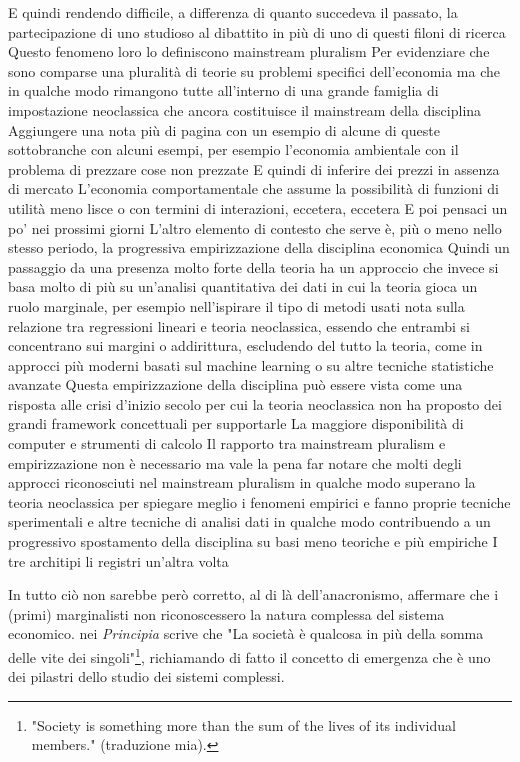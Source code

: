 \documentclass[a4paper, headings=standardclasses]{scrartcl}
\begin{document}
E quindi rendendo difficile, a differenza di quanto succedeva il passato, la partecipazione di uno studioso al dibattito
in più di uno di questi filoni di ricerca
Questo fenomeno loro lo definiscono mainstream pluralism
Per evidenziare che sono comparse una pluralità di teorie su problemi specifici dell'economia
ma che in qualche modo rimangono tutte all'interno di una grande famiglia di impostazione neoclassica che ancora costituisce il mainstream della disciplina
Aggiungere una nota più di pagina con un esempio di alcune di queste sottobranche
con alcuni esempi, per esempio l'economia ambientale con il problema di prezzare cose non prezzate
E quindi di inferire dei prezzi in assenza di mercato
L'economia comportamentale che assume la possibilità di funzioni di utilità meno lisce o con termini di interazioni, eccetera, eccetera
E poi pensaci un po' nei prossimi giorni
L'altro elemento di contesto che serve è, più o meno nello stesso periodo, la progressiva empirizzazione della disciplina economica
Quindi un passaggio da una presenza molto forte della teoria
ha un approccio che invece si basa molto di più su un'analisi quantitativa dei dati
in cui la teoria gioca un ruolo marginale, per esempio nell'ispirare il tipo di metodi usati
nota sulla relazione tra regressioni lineari e teoria neoclassica, essendo che entrambi si concentrano sui margini
o addirittura, escludendo del tutto la teoria, come in approcci più moderni basati sul machine learning
o su altre tecniche statistiche avanzate
Questa empirizzazione della disciplina può essere vista come una risposta alle crisi d'inizio secolo
per cui la teoria neoclassica non ha proposto dei grandi framework concettuali per supportarle
La maggiore disponibilità di computer e strumenti di calcolo
Il rapporto tra mainstream pluralism e empirizzazione non è necessario
ma vale la pena far notare che molti degli approcci riconosciuti nel mainstream pluralism
in qualche modo superano la teoria neoclassica per spiegare meglio i fenomeni empirici
e fanno proprie tecniche sperimentali e altre tecniche di analisi dati
in qualche modo contribuendo a un progressivo spostamento della disciplina su basi meno teoriche e più empiriche
I tre architipi li registri un'altra volta

In tutto ciò non sarebbe però corretto, al di là dell'anacronismo, affermare che i (primi) marginalisti non riconoscessero la natura complessa del sistema economico.
\textcite[p. 20]{marshall1988} nei \textit{Principia} scrive che "La società è qualcosa in più della somma delle vite dei singoli"\footnote{"Society is something more than the sum of the lives of its individual members." (traduzione mia).}, richiamando di fatto il concetto di emergenza che è uno dei pilastri dello studio dei sistemi complessi.
\end{document}

